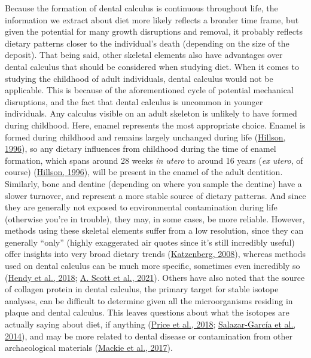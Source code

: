 \documentclass[
  letterpaper,
]{book}
\begin{document}
Because the formation of dental calculus is continuous throughout life,
the information we extract about diet more likely reflects a broader
time frame, but given the potential for many growth disruptions and
removal, it probably reflects dietary patterns closer to the
individual's death (depending on the size of the deposit). That being
said, other skeletal elements also have advantages over dental calculus
that should be considered when studying diet. When it comes to studying
the childhood of adult individuals, dental calculus would not be
applicable. This is because of the aforementioned cycle of potential
mechanical disruptions, and the fact that dental calculus is uncommon in
younger individuals. Any calculus visible on an adult skeleton is
unlikely to have formed during childhood. Here, enamel represents the
most appropriate choice. Enamel is formed during childhood and remains
largely unchanged during life
(\protect\hyperlink{ref-hillsonDentalAnthropology1996}{Hillson, 1996}),
so any dietary influences from childhood during the time of enamel
formation, which spans around 28 weeks \emph{in utero} to around 16
years (\emph{ex utero}, of course)
(\protect\hyperlink{ref-hillsonDentalAnthropology1996}{Hillson, 1996}),
will be present in the enamel of the adult dentition. Similarly, bone
and dentine (depending on where you sample the dentine) have a slower
turnover, and represent a more stable source of dietary patterns. And
since they are generally not exposed to environmental contamination
during life (otherwise you're in trouble), they may, in some cases, be
more reliable. However, methods using these skeletal elements suffer
from a low resolution, since they can generally ``only'' (highly
exaggerated air quotes since it's still incredibly useful) offer
insights into very broad dietary trends
(\protect\hyperlink{ref-katzenbergStableIsotope2008}{Katzenberg, 2008}),
whereas methods used on dental calculus can be much more specific,
sometimes even incredibly so
(\protect\hyperlink{ref-hendyProteomicCalculus2018}{Hendy et al., 2018};
\protect\hyperlink{ref-scottExoticFoods2021}{A. Scott et al., 2021}).
Others have also noted that the source of collagen protein in dental
calculus, the primary target for stable isotope analyses, can be
difficult to determine given all the microorganisms residing in plaque
and dental calculus. This leaves questions about what the isotopes are
actually saying about diet, if anything
(\protect\hyperlink{ref-priceTestingValidity2018}{Price et al., 2018};
\protect\hyperlink{ref-salazar-garciaDentalCalculus2014}{Salazar-García
et al., 2014}), and may be more related to dental disease or
contamination from other archaeological materials
(\protect\hyperlink{ref-mackiePreservationMetaproteome2017}{Mackie et
al., 2017}).
\end{document}
